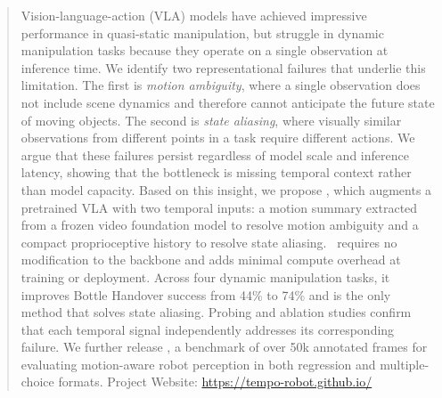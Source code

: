 \begin{abstract}
Vision-language-action (VLA) models have achieved impressive performance in quasi-static manipulation, but struggle in dynamic manipulation tasks because they operate on a single observation at inference time. We identify two representational failures that underlie this limitation. The first is \emph{motion ambiguity}, where a single observation does not include scene dynamics and therefore cannot anticipate the future state of moving objects. The second is \emph{state aliasing}, where visually similar observations from different points in a task require different actions. We argue that these failures persist regardless of model scale and inference latency, showing that the bottleneck is missing temporal context rather than model capacity. Based on this insight, we propose \ours, which augments a pretrained VLA with two temporal inputs: a motion summary extracted from a frozen video foundation model to resolve motion ambiguity and a compact proprioceptive history to resolve state aliasing. \ours\ requires no modification to the backbone and adds minimal compute overhead at training or deployment. Across four dynamic manipulation tasks, it improves Bottle Handover success from 44\% to 74\% and is the only method that solves state aliasing. Probing and ablation studies confirm that each temporal signal independently addresses its corresponding failure. We further release \benchname, a benchmark of over 50k annotated frames for evaluating motion-aware robot perception in both regression and multiple-choice formats.
Project Website: \url{https://tempo-robot.github.io/}
  

\end{abstract}

